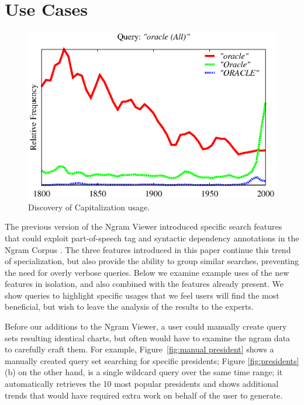\documentclass[11pt]{article}
\begin{document}
\section{Use Cases}
\label{sec:usecases}
\begin{figure}
\centering

\includegraphics[width=0.9\columnwidth]{graphs/oracle}
\caption{\label{fig:apple} Discovery of Capitalization usage.}

\end{figure}

The previous version of the Ngram Viewer introduced specific search features that could exploit part-of-speech tag and syntactic dependency annotations in the Ngram Corpus \cite{lin2012syntactic}. The three features introduced in this paper continue this trend of specialization, but also provide the ability to group similar searches, preventing the need for overly verbose queries. Below we examine example uses of the new features in isolation, and also combined with the features already present. We show queries to highlight specific usages that we feel users will find the most beneficial, but wish to leave the analysis of the results to the experts.

Before our additions to the Ngram Viewer, a user could manually create query sets resulting identical charts, but often would have to examine the ngram data to carefully craft them. For example, Figure~\ref{fig:manual president} shows a manually created query set searching for specific presidents; Figure \ref{fig:presidents}(b) on the other hand, is a single wildcard query over the same time range; it automatically retrieves the 10 most popular presidents and shows additional trends that would have required extra work on behalf of the user to generate.
\end{document}
